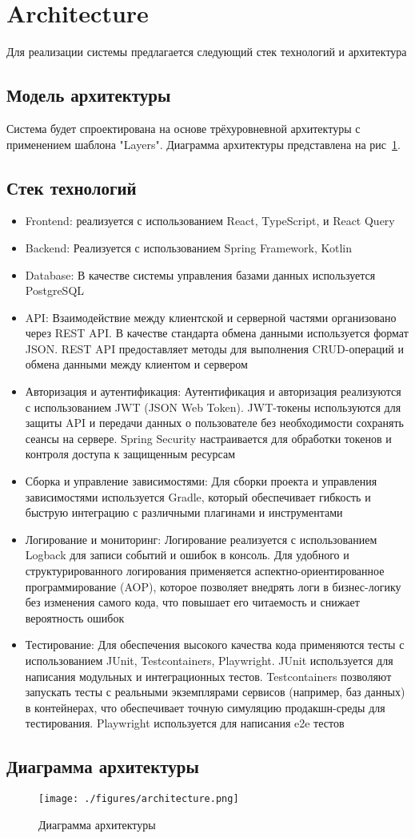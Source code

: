 \section{Architecture}
Для реализации системы предлагается следующий стек технологий и архитектура

\subsection{Модель архитектуры}
Система будет спроектирована на основе трёхуровневной архитектуры с применением шаблона "Layers".
Диаграмма архитектуры представлена на рис~\ref{fig:arch}.
\subsection{Стек технологий}
\begin{itemize}
	\item Frontend: реализуется с использованием React, TypeScript, и React Query
	\item Backend: Реализуется с использованием Spring Framework, Kotlin
	\item Database: В качестве системы управления базами данных используется PostgreSQL
	\item API: Взаимодействие между клиентской и серверной частями организовано через REST API. В качестве стандарта обмена данными используется формат JSON. REST API предоставляет методы для выполнения CRUD-операций и обмена данными между клиентом и сервером
	\item Авторизация и аутентификация: Аутентификация и авторизация реализуются с использованием JWT (JSON Web Token). JWT-токены используются для защиты API и передачи данных о пользователе без необходимости сохранять сеансы на сервере. Spring Security настраивается для обработки токенов и контроля доступа к защищенным ресурсам
	\item Сборка и управление зависимостями: Для сборки проекта и управления зависимостями используется Gradle, который обеспечивает гибкость и быструю интеграцию с различными плагинами и инструментами
	\item Логирование и мониторинг: Логирование реализуется с использованием Logback для записи событий и ошибок в консоль. Для удобного и структурированного логирования применяется аспектно-ориентированное программирование (AOP), которое позволяет внедрять логи в бизнес-логику без изменения самого кода, что повышает его читаемость и снижает вероятность ошибок
	\item Тестирование: Для обеспечения высокого качества кода применяются тесты с использованием JUnit, Testcontainers, Playwright. JUnit используется для написания модульных и интеграционных тестов. Testcontainers позволяют запускать тесты с реальными экземплярами сервисов (например, баз данных) в контейнерах, что обеспечивает точную симуляцию продакшн-среды для тестирования. Playwright используется для написания e2e тестов
\end{itemize}

\subsection{Диаграмма архитектуры}
\begin{figure}[h]
	\centering
	\texttt{[image: ./figures/architecture.png]}
	\caption{Диаграмма архитектуры}\label{fig:arch}
\end{figure}
